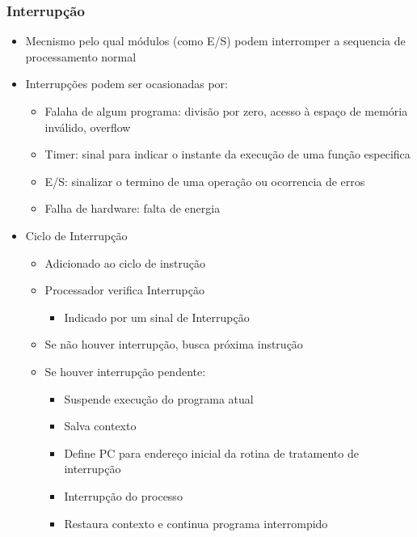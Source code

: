 \documentclass[12pt]{article}
\begin{document}
        \subsubsection{Interrupção}
        \begin{itemize}
            \item Mecnismo pelo qual módulos (como E/S) podem interromper a 
            sequencia de processamento normal
            \item Interrupções podem ser ocasionadas por:
            \begin{itemize}
                \item Falaha de algum programa: divisão por zero, acesso à 
                espaço de memória inválido, overflow
                \item Timer: sinal para indicar o instante da execução de uma 
                função especifica
                \item E/S: sinalizar o termino de uma operação ou ocorrencia de 
                erros
                \item Falha de hardware: falta de energia
            \end{itemize}
            \item Ciclo de Interrupção
            \begin{itemize}
                \item Adicionado ao ciclo de instrução
                \item Processador verifica Interrupção
                \begin{itemize}
                    \item Indicado por um sinal de Interrupção
                \end{itemize}
                \item Se não houver interrupção, busca próxima instrução
                \item Se houver interrupção pendente:
                \begin{itemize}
                    \item Suspende execução do programa atual
                    \item Salva contexto
                    \item Define PC para endereço inicial da rotina de 
                    tratamento de interrupção
                    \item Interrupção do processo
                    \item Restaura contexto e continua programa interrompido

\end{itemize}
\end{itemize}
\end{itemize}
\end{document}
